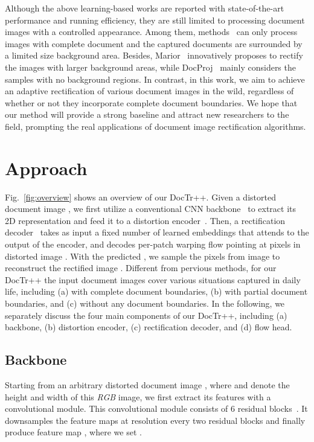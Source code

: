 \documentclass[lettersize,journal]{IEEEtran}
\begin{document}
Although the above learning-based works are reported with state-of-the-art performance and running efficiency,
they are still limited to processing document images with a controlled appearance.
Among them, methods~\cite{9010747,das2021end,feng2021doctr,jiang2022revisiting,liu2020geometric,8578592,xie2021document,xie2020dewarping,xue2022fourier,feng2021docscanner,feng2022geometric,markovitz2020can,li2019document,zhang2022marior,ma2022learning} can only process images with complete document and the captured documents are surrounded by a limited size background area.
Besides, Marior~\cite{zhang2022marior} innovatively proposes to rectify the images with larger background areas, while DocProj~\cite{li2019document} mainly considers the samples with no background regions.
In contrast, in this work, we aim to achieve an adaptive rectification of various document images in the wild, regardless of whether or not they incorporate complete document boundaries.
We hope that our method will provide a strong baseline and attract new researchers to the field, prompting the real applications of document image rectification algorithms.


\section{Approach}
Fig.~\ref{fig:overview} shows an overview of our DocTr++. 
Given a distorted document image ,
we first utilize a conventional CNN backbone~\cite{he2016deep} to extract its 2D representation and feed it to a distortion encoder~\cite{Vaswani2017AttentionIA}.
Then, a rectification decoder~\cite{Vaswani2017AttentionIA} takes as input a fixed number of learned embeddings that attends to the output of the encoder,
and decodes per-patch warping flow  pointing at pixels in distorted image . With the predicted , we sample the pixels from image  to reconstruct the rectified image .
Different from pervious methods, for our DocTr++ the input document images  cover various situations captured in daily life, including (a) with complete document boundaries, (b) with partial document boundaries, and (c) without any document boundaries. 
In the following, we separately discuss the four main components of our DocTr++, including (a) backbone, (b) distortion encoder, (c) rectification decoder, and (d) flow head.

\subsection{Backbone}
Starting from an arbitrary distorted document image , where  and  denote the height and width of this \emph{RGB} image, we first extract its features with a convolutional module. This convolutional module consists of 6 residual blocks~\cite{he2016deep}. It downsamples the feature maps at  resolution every two residual blocks and finally produce feature map , where we set .
                                                               
\end{document}

